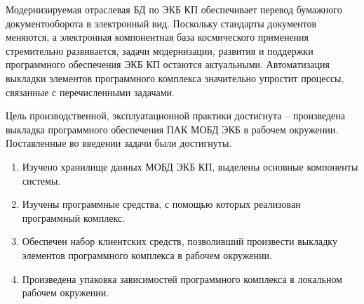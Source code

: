
Модернизируемая отраслевая БД по ЭКБ КП обеспечивает перевод бумажного документооборота в электронный вид. Поскольку стандарты документов меняются, а электронная компонентная база космического применения стремительно развивается, задачи модернизации, развития и поддержки программного обеспечения ЭКБ КП остаются актуальными. Автоматизация выкладки элементов программного комплекса значительно упростит процессы, связанные с перечисленными задачами.

Цель производственной, эксплуатационной практики достигнута -- произведена выкладка программного обеспечения ПАК МОБД ЭКБ в рабочем окружении. Поставленные во введении задачи были достигнуты.
\begin{enumerate}
	\item Изучено хранилище данных МОБД ЭКБ КП, выделены основные компоненты системы.
	\item Изучены программные средства, с помощью которых реализован программный комплекс.
	\item Обеспечен набор клиентских средств, позволивший произвести выкладку элементов программного комплекса в рабочем окружении.
	\item Произведена упаковка зависимостей программного комплекса в локальном рабочем окружении.
\end{enumerate}